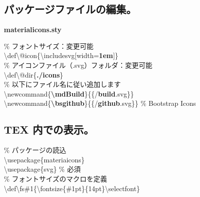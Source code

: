 \documentclass[a5j,10pt]{ltjarticle}
\def\fs#1{\fontsize{#1pt}{14pt}\selectfont}
\begin{document}
\subsection{パッケージファイルの編集。}
\textbf{materialicons.sty}\\  
{\fs{8}
\hspace{4mm}\% フォントサイズ：変更可能\vspace{1mm}\\
\hspace{4mm}\textbackslash def\textbackslash @icon\{\textbackslash includesvg[width=\textbf{1em}]\}\vspace{2mm}\\
\hspace{4mm}\% アイコンファイル（.svg）フォルダ：変更可能\vspace{1mm}\\
\hspace{4mm}\textbackslash def\textbackslash @dir\{\textbf{./icons}\}\vspace{2mm}\\
\hspace{4mm}\% 以下にファイル名に従い追加します\vspace{1mm}\\
\hspace{4mm}\textbackslash newcommand\{\textcolor{code}{\textbf{\textbackslash mdBuild}}\}\{\textbackslash@icon\{\textbackslash@dir/\textcolor{code}{\textbf{build}}.svg\}\}\\
\hspace{4mm}\textbackslash newcommand\{\textcolor{code}{\textbf{\textbackslash bsgithub}}\}\{\textbackslash@icon\{\textbackslash@dir/\textcolor{code}{\textbf{github}}.svg\}\} \% Bootstrap Icons

}

\subsection{TEX 内での表示。}
\% パッケージの読込\\
\hspace{4mm}\textbackslash usepackage\{materiaicons\}\\
\hspace{4mm}\textbackslash usepackage\{svg\} \% 必須\\

\% フォントサイズのマクロを定義\\
\hspace{4mm}\textbackslash def\textbackslash fs\#1\{\textbackslash fontsize\{\#1pt\}\{14pt\}\textbackslash selectfont\}
  
\end{document}
